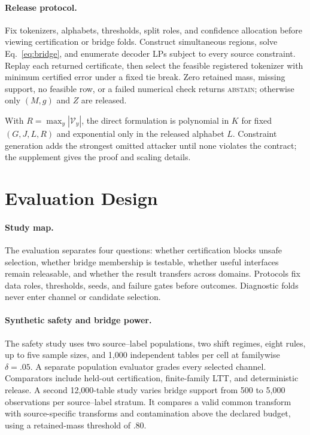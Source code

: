 \paragraph{Release protocol.}
Fix tokenizers, alphabets, thresholds, split roles, and confidence allocation
before viewing certification or bridge folds. Construct simultaneous regions,
solve Eq.~\eqref{eq:bridge}, and enumerate decoder LPs subject to every source
constraint. Replay each returned certificate, then select the feasible
registered tokenizer with minimum certified error under a fixed tie break.
Zero retained mass, missing support, no feasible row, or a failed numerical
check returns \textsc{abstain}; otherwise only $(M,g)$ and $Z$ are released.

With $R=\max_y|\mathcal V_y|$, the direct formulation is polynomial in $K$ for
fixed $(G,J,L,R)$ and exponential only in the released alphabet $L$. Constraint
generation adds the strongest omitted attacker until none violates the contract;
the supplement gives the proof and scaling details.

\section{Evaluation Design}

\paragraph{Study map.}
The evaluation separates four questions: whether certification blocks unsafe
selection, whether bridge membership is testable, whether useful interfaces
remain releasable, and whether the result transfers across domains. Protocols
fix data roles, thresholds, seeds, and failure gates before outcomes.
Diagnostic folds never enter channel or candidate selection.

\paragraph{Synthetic safety and bridge power.}
The safety study uses two source--label populations, two shift regimes, eight
rules, up to five sample sizes, and 1,000 independent tables per cell at
familywise $\delta=.05$. A separate population evaluator grades every selected
channel. Comparators include held-out certification, finite-family LTT, and
deterministic release. A second 12,000-table study varies bridge support from
500 to 5,000 observations per source--label stratum. It compares a valid common
transform with source-specific transforms and contamination above the declared
budget, using a retained-mass threshold of $.80$.

